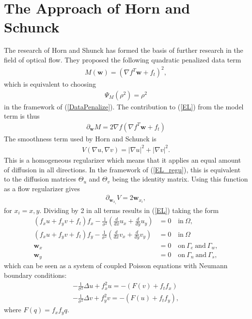 \chapter{The Approach of Horn and Schunck}
The research of Horn and Shunck has formed the basis of further research in the field of optical flow. They proposed the following quadratic penalized data term
\begin{align}
M(\textbf{w}) = (\nabla f^T \textbf{w} + f_t)^2,
\end{align}
which is equivalent to choosing
\begin{align*}
\Psi_M(\rho^2) = \rho^2
\end{align*}
in the framework of (\ref{DataPenalize}). The contribution to (\ref{EL}) from the model term is thus 
\begin{equation}
\begin{aligned}
\partial_{\textbf{w}} M = 2\nabla f(\nabla f ^T  \textbf{w} + f_t)
\end{aligned}
\end{equation}
The smoothness term used by Horn and Schunck is
\begin{align*}
V(\nabla u, \nabla v) = |\nabla u|^2 + |\nabla v|^2.
\end{align*}
This is a homogeneous regularizer which means that it applies an equal amount of diffusion in all directions. In the framework of (\ref{EL_regu}), this is equivalent to the diffusion matrices $\Theta_u$ and $\Theta_v$ being the identity matrix. Using this function as a flow regularizer gives
\begin{align*}
\partial_ {\textbf{w}_{x_i}} V = 2\textbf{w}_{x_i},
\end{align*}
for $x_i = x, y$. Dividing by 2 in all terms results in (\ref{EL}) taking the form 
\begin{equation}
\label{EL_HS}
\begin{aligned}
(f_x u + f_y v + f_t) f_x - \frac{1}{\sigma^2}(\frac{d}{d x} u_x + \frac{d}{d y} u_y ) &= 0  \quad \text{in} \ \Omega,  \\
(f_x u + f_y v + f_t) f_y - \frac{1}{\sigma^2}(\frac{d}{d x} v_x + \frac{d}{d y} v_y ) &= 0  \quad \text{in} \ \Omega  \\
\textbf{w}_{x} &= 0 \quad \text{on} \ \Gamma_e \ \text{and} \ \Gamma_w, \\
\textbf{w}_{y} &= 0 \quad \text{on} \ \Gamma_n \ \text{and} \ \Gamma_s,
\end{aligned}
\end{equation}
which can be seen as a system of coupled Poisson equations with Neumann boundary conditions:
\begin{align*}
-\frac{1}{\sigma^2} \Delta u + f_x ^2 u = - (F(v) + f_tf_x) \\
-\frac{1}{\sigma^2} \Delta v + f_y ^2 v = - (F(u) + f_tf_y) ,
\end{align*}
where $F(q) = f_xf_y q$.


